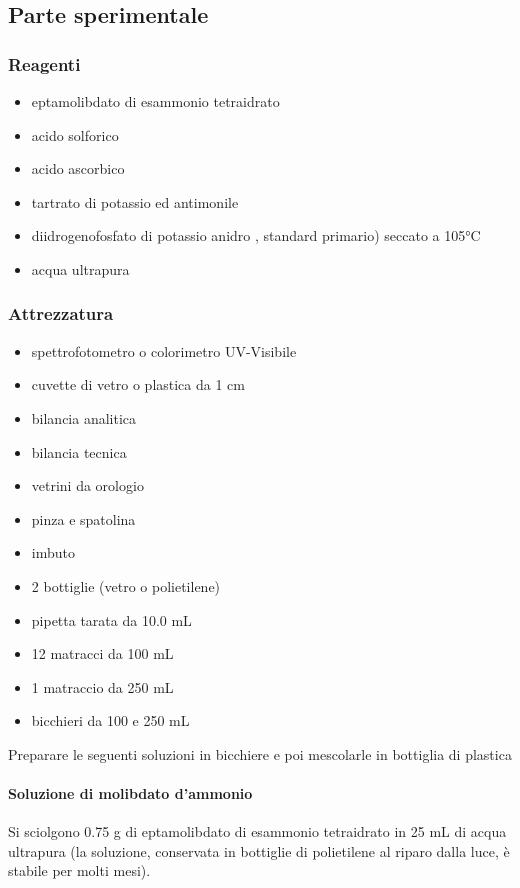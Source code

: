 \subsection{Parte sperimentale}

\subsubsection{Reagenti}
\begin{itemize}
\item eptamolibdato di esammonio tetraidrato 
\item acido solforico
\item acido ascorbico 
\item tartrato di potassio ed antimonile 
\item diidrogenofosfato di potassio anidro , standard primario) seccato a 105°C
\item acqua ultrapura
\end{itemize}


\subsubsection{Attrezzatura}
\begin{itemize}
\item spettrofotometro o colorimetro UV-Visibile
\item cuvette di vetro o plastica da 1 cm
\item bilancia analitica
\item bilancia tecnica
\item vetrini da orologio
\item pinza e spatolina
\item imbuto
\item 2 bottiglie (vetro o polietilene)
\item pipetta tarata da 10.0 mL
\item 12 matracci da 100 mL
\item 1 matraccio da 250 mL
\item bicchieri da 100 e 250 mL
\end{itemize}

Preparare le seguenti soluzioni in bicchiere e poi mescolarle in bottiglia di plastica

\paragraph{Soluzione di molibdato d'ammonio}
Si sciolgono 0.75 g di eptamolibdato di esammonio tetraidrato in 25 mL di acqua ultrapura (la soluzione, conservata in bottiglie di polietilene al riparo dalla luce, è stabile per molti mesi).

